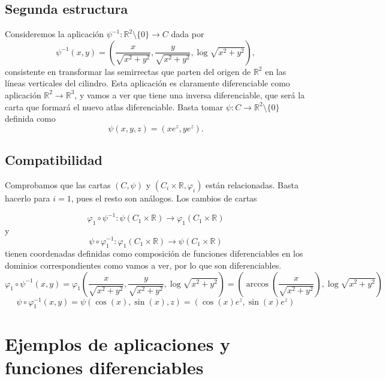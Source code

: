 \documentclass[twoside, 11pt]{article}
\theoremstyle{definition}
\newcommand{\R}{\mathbb{R}}
\begin{document}
\subsection{Segunda estructura}



Consideremos la aplicación $\psi^{-1}:\R^2 \setminus\{0\}\to C$ dada por $$\psi^{-1}(x,y)=\left(\frac{x}{\sqrt{x^2+y^2}},\frac{y}{\sqrt{x^2+y^2}}, \log\sqrt{x^2+y^2} \right),$$ consistente en transformar las semirrectas que parten del origen de $\R^2$ en las líneas verticales del cilindro. Esta aplicación es claramente diferenciable como aplicación $\R^2\to\R^3$, y vamos a ver que tiene una inversa diferenciable, que será la carta que formará el nuevo atlas diferenciable. Basta tomar $\psi:C\to\R^2\setminus\{0\}$ definida como $$\psi(x,y,z)=(xe^z,ye^z).$$ 

\subsection{Compatibilidad}

Comprobamos que las cartas $(C, \psi)$ y $(C_i\times\R, \varphi_i)$ están relacionadas. Basta hacerlo para $i=1$, pues el resto son análogos. Los cambios de cartas

\[
\varphi_1\circ \psi^{-1}: \psi(C_1\times\R)\to \varphi_1(C_1\times\R)
\]
y 
\[
\psi\circ\varphi_1^{-1} : \varphi_1(C_1\times\R)\to \psi(C_1\times\R)
\]
tienen coordenadas definidas como composición de funciones diferenciables en los dominios correspondientes como vamos a ver, por lo que son diferenciables. 
\[
\varphi_1\circ \psi^{-1}(x,y)=\varphi_1\left(\frac{x}{\sqrt{x^2+y^2}},\frac{y}{\sqrt{x^2+y^2}}, \log\sqrt{x^2+y^2} \right)=\left(\arccos\left(\frac{x}{\sqrt{x^2+y^2}}\right),  \log\sqrt{x^2+y^2} \right)
\]
\[
\psi\circ\varphi_1^{-1}(x,y)=\psi(\cos(x),\sin(x),z)=(\cos(x)e^z,\sin(x)e^z)
\]

\section{Ejemplos de aplicaciones y funciones diferenciables}
\end{document}
